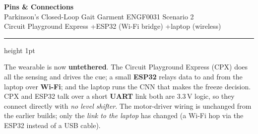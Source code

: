 \documentclass[11pt]{article}
\begin{document}
\begin{center}
  {\LARGE\bfseries Pins \& Connections}\\[3pt]
  {\large Parkinson's Closed-Loop Gait Garment \textemdash{} ENGF0031 Scenario 2}\\[3pt]
  {\color{slate}\small Circuit Playground Express \quad+\quad ESP32 (Wi-Fi bridge) \quad+\quad laptop (wireless)}
\end{center}
\vspace{2pt}
{\color{rule}\hrule height 1pt}
\vspace{8pt}

\noindent
The wearable is now \textbf{untethered}. The Circuit Playground Express (CPX) does all the
sensing and drives the cue; a small \textbf{ESP32} relays data to and from the laptop
over \textbf{Wi-Fi}; and the laptop runs the CNN that makes the freeze decision. CPX and ESP32 talk
over a short \textbf{UART} link \textemdash{} both are 3.3\,V logic, so they connect directly with
\emph{no level shifter}. The motor-driver wiring is unchanged from the earlier builds; only the
\emph{link to the laptop} has changed (a Wi-Fi hop via the ESP32 instead of a USB cable).

\end{document}
